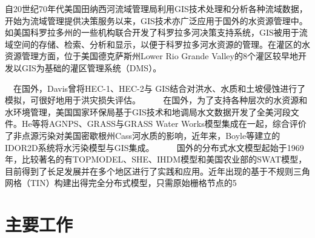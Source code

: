 自20世纪70年代美国田纳西河流域管理局利用GIS技术处理和分析各种流域数据，开始为流域管理提供决策服务以来，GIS技术亦广泛应用于国外的水资源管理中。如美国科罗拉多州的一些机构联合开发了科罗拉多河决策支持系统，GIS被用于流域空间的存储、检索、分析和显示，以便于科罗拉多河水资源的管理。在灌区的水资源管理方面，位于美国德克萨斯州Lower Rio Grande Valley的8个灌区较早地开发以GIS为基础的灌区管理系统（DMS）。

　在国外，Davis曾将HEC-1、HEC-2与 GIS结合对洪水、水质和土坡侵蚀进行了模拟，可很好地用于洪灾损失评估。
　
　在国外，为了支持各种层次的水资源和水环境管理，美国国家环保局基于GIS技术和地调局水文数据开发了全美河段文件。He等将AGNPS、GRASS与GRASS Water Works模型集成在一起，综合评价了非点源污染对美国密歇根州Cass河水质的影响，近年来，Boyle等建立的IDOR2D系统将水污染模型与GIS集成。
　
　国外的分布式水文模型起始于1969年，比较著名的有TOPMODEL、SHE、IHDM模型和美国农业部的SWAT模型，目前得到了长足发展并在多个地区进行了实践和应用。近年出现的基于不规则三角网格（TIN）构建出得完全分布式模型，只需原始栅格节点的5%
\section{主要工作}

